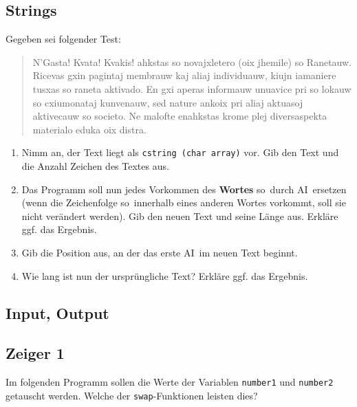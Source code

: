 \documentclass[11pt, a4paper]{article}
\newif\ifshowsolution
\begin{document}
\ifshowsolution
	
\fi

\subsection{Strings}
Gegeben sei folgender Test:
\begin{quote}
	N'Gasta! Kvata! Kvakis! ahkstas so novajxletero (oix jhemile) so Ranetauw. Ricevas gxin pagintaj membrauw kaj aliaj individuauw, kiujn iamaniere tusxas so raneta aktivado. En gxi aperas informauw unuavice pri so lokauw so cxiumonataj kunvenauw, sed nature ankoix pri aliaj aktuasoj aktivecauw so societo. Ne malofte enahkstas krome plej diversaspekta materialo eduka oix distra.
\end{quote}
\begin{enumerate}
	\item Nimm an, der Text liegt als \texttt{cstring (char array)} vor. Gib den Text und die Anzahl Zeichen des Textes aus.
	\item Das Programm soll nun jedes Vorkommen des \textbf{Wortes} \glqq so\grqq\ durch \glqq AI\grqq\ ersetzen (wenn die Zeichenfolge \glqq so\grqq\ innerhalb eines anderen Wortes vorkommt, soll sie nicht verändert werden). Gib den neuen Text und seine Länge aus. Erkläre ggf. das Ergebnis.
	\item Gib die Position aus, an der das erste \glqq AI\grqq\ im neuen Text beginnt.
	\item Wie lang ist nun der ursprüngliche Text? Erkläre ggf. das Ergebnis.
\end{enumerate}

\ifshowsolution
	
\fi

\subsection{Input, Output}

\subsection{Zeiger 1}
Im folgenden Programm sollen die Werte der Variablen \texttt{number1} und \texttt{number2} getauscht werden. Welche der \texttt{swap}-Funktionen leisten dies?


\end{document}

